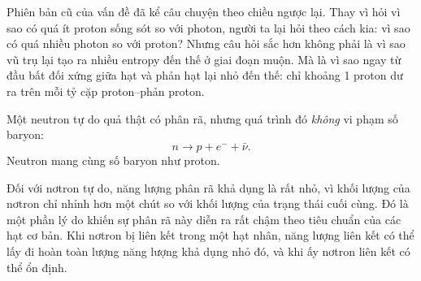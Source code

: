 Phiên bản cũ của vấn đề đã kể câu chuyện theo chiều ngược lại. Thay vì hỏi vì sao có quá ít proton sống sót so với photon, người ta lại hỏi theo cách kia: vì sao có quá nhiều photon so với proton? Nhưng câu hỏi sắc hơn không phải là vì sao vũ trụ lại tạo ra nhiều entropy đến thế ở giai đoạn muộn. Mà là vì sao ngay từ đầu bất đối xứng giữa hạt và phản hạt lại nhỏ đến thế: chỉ khoảng 1 proton dư ra trên mỗi tỷ cặp proton--phản proton.

Một neutron tự do quả thật có phân rã, nhưng quá trình đó \emph{không} vi phạm số baryon:
\[
n \to p + e^- + \bar\nu.
\]
Neutron mang cùng số baryon như proton.

Đối với nơtron tự do, năng lượng phân rã khả dụng là rất nhỏ, vì khối lượng của nơtron chỉ nhỉnh hơn một chút so với khối lượng của trạng thái cuối cùng. Đó là một phần lý do khiến sự phân rã này diễn ra rất chậm theo tiêu chuẩn của các hạt cơ bản. Khi nơtron bị liên kết trong một hạt nhân, năng lượng liên kết có thể lấy đi hoàn toàn lượng năng lượng khả dụng nhỏ đó, và khi ấy nơtron liên kết có thể ổn định.

\begin{classroomqa}
\end{classroomqa}